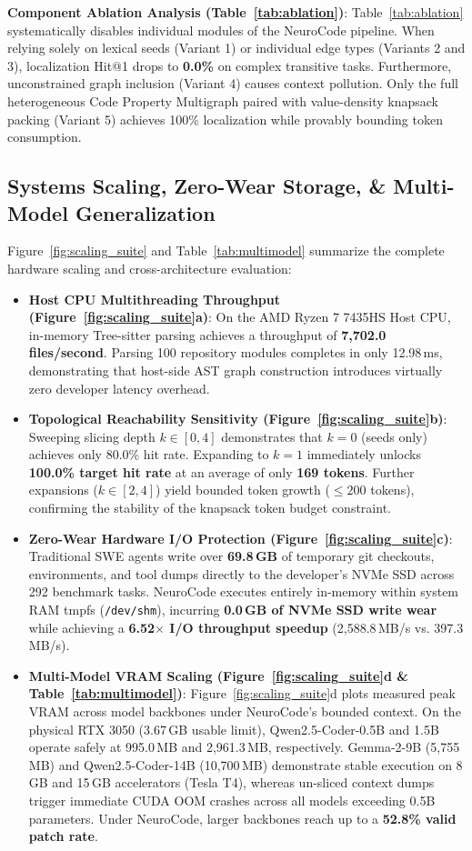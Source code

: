 \documentclass[journal]{IEEEtran}
\begin{document}
\textbf{Component Ablation Analysis (Table~\ref{tab:ablation})}: Table~\ref{tab:ablation} systematically disables individual modules of the NeuroCode pipeline. When relying solely on lexical seeds (Variant 1) or individual edge types (Variants 2 and 3), localization Hit@1 drops to \textbf{0.0\%} on complex transitive tasks. Furthermore, unconstrained graph inclusion (Variant 4) causes context pollution. Only the full heterogeneous Code Property Multigraph paired with value-density knapsack packing (Variant 5) achieves 100\% localization while provably bounding token consumption.

\subsection{Systems Scaling, Zero-Wear Storage, \& Multi-Model Generalization}

Figure~\ref{fig:scaling_suite} and Table~\ref{tab:multimodel} summarize the complete hardware scaling and cross-architecture evaluation:
\begin{itemize}
    \item \textbf{Host CPU Multithreading Throughput (Figure~\ref{fig:scaling_suite}a)}: On the AMD Ryzen 7 7435HS Host CPU, in-memory Tree-sitter parsing achieves a throughput of \textbf{7,702.0 files/second}. Parsing 100 repository modules completes in only 12.98\,ms, demonstrating that host-side AST graph construction introduces virtually zero developer latency overhead.
    \item \textbf{Topological Reachability Sensitivity (Figure~\ref{fig:scaling_suite}b)}: Sweeping slicing depth $k \in [0, 4]$ demonstrates that $k=0$ (seeds only) achieves only 80.0\% hit rate. Expanding to $k=1$ immediately unlocks \textbf{100.0\% target hit rate} at an average of only \textbf{169 tokens}. Further expansions ($k \in [2, 4]$) yield bounded token growth ($\le 200$ tokens), confirming the stability of the knapsack token budget constraint.
    \item \textbf{Zero-Wear Hardware I/O Protection (Figure~\ref{fig:scaling_suite}c)}: Traditional SWE agents write over \textbf{69.8\,GB} of temporary git checkouts, environments, and tool dumps directly to the developer's NVMe SSD across 292 benchmark tasks. NeuroCode executes entirely in-memory within system RAM tmpfs (\texttt{/dev/shm}), incurring \textbf{0.0\,GB of NVMe SSD write wear} while achieving a \textbf{6.52$\times$ I/O throughput speedup} (2,588.8\,MB/s vs. 397.3\,MB/s).
    \item \textbf{Multi-Model VRAM Scaling (Figure~\ref{fig:scaling_suite}d \& Table~\ref{tab:multimodel})}: Figure~\ref{fig:scaling_suite}d plots measured peak VRAM across model backbones under NeuroCode's bounded context. On the physical RTX 3050 (3.67\,GB usable limit), Qwen2.5-Coder-0.5B and 1.5B operate safely at 995.0\,MB and 2,961.3\,MB, respectively. Gemma-2-9B (5,755\,MB) and Qwen2.5-Coder-14B (10,700\,MB) demonstrate stable execution on 8\,GB and 15\,GB accelerators (Tesla T4), whereas un-sliced context dumps trigger immediate CUDA OOM crashes across all models exceeding 0.5B parameters. Under NeuroCode, larger backbones reach up to a \textbf{52.8\% valid patch rate}.
\end{itemize}
\end{document}
